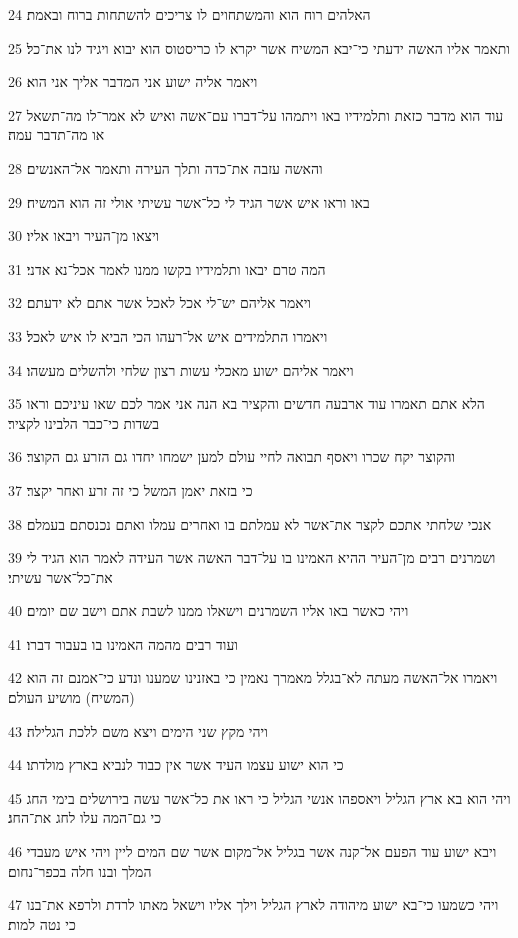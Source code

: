 \par 24 האלהים רוח הוא והמשתחוים לו צריכים להשתחות ברוח ובאמת׃
\par 25 ותאמר אליו האשה ידעתי כי־יבא המשיח אשר יקרא לו כריסטוס הוא יבוא ויגיד לנו את־כל׃
\par 26 ויאמר אליה ישוע אני המדבר אליך אני הוא׃
\par 27 עוד הוא מדבר כזאת ותלמידיו באו ויתמהו על־דברו עם־אשה ואיש לא אמר־לו מה־תשאל או מה־תדבר עמה׃
\par 28 והאשה עזבה את־כדה ותלך העירה ותאמר אל־האנשים׃
\par 29 באו וראו איש אשר הגיד לי כל־אשר עשיתי אולי זה הוא המשיח׃
\par 30 ויצאו מן־העיר ויבאו אליו׃
\par 31 המה טרם יבאו ותלמידיו בקשו ממנו לאמר אכל־נא אדני׃
\par 32 ויאמר אליהם יש־לי אכל לאכל אשר אתם לא ידעתם׃
\par 33 ויאמרו התלמידים איש אל־רעהו הכי הביא לו איש לאכל׃
\par 34 ויאמר אליהם ישוע מאכלי עשות רצון שלחי ולהשלים מעשהו׃
\par 35 הלא אתם תאמרו עוד ארבעה חדשים והקציר בא הנה אני אמר לכם שאו עיניכם וראו בשדות כי־כבר הלבינו לקציר׃
\par 36 והקוצר יקח שכרו ויאסף תבואה לחיי עולם למען ישמחו יחדו גם הזרע גם הקוצר׃
\par 37 כי בזאת יאמן המשל כי זה זרע ואחר יקצר׃
\par 38 אנכי שלחתי אתכם לקצר את־אשר לא עמלתם בו ואחרים עמלו ואתם נכנסתם בעמלם׃
\par 39 ושמרנים רבים מן־העיר ההיא האמינו בו על־דבר האשה אשר העידה לאמר הוא הגיד לי את־כל־אשר עשיתי׃
\par 40 ויהי כאשר באו אליו השמרנים וישאלו ממנו לשבת אתם וישב שם יומים׃
\par 41 ועוד רבים מהמה האמינו בו בעבור דברו׃
\par 42 ויאמרו אל־האשה מעתה לא־בגלל מאמרך נאמין כי באזנינו שמענו ונדע כי־אמנם זה הוא (המשיח) מושיע העולם׃
\par 43 ויהי מקץ שני הימים ויצא משם ללכת הגלילה׃
\par 44 כי הוא ישוע עצמו העיד אשר אין כבוד לנביא בארץ מולדתו׃
\par 45 ויהי הוא בא ארץ הגליל ויאספהו אנשי הגליל כי ראו את כל־אשר עשה בירושלים בימי החג כי גם־המה עלו לחג את־החג׃
\par 46 ויבא ישוע עוד הפעם אל־קנה אשר בגליל אל־מקום אשר שם המים ליין ויהי איש מעבדי המלך ובנו חלה בכפר־נחום׃
\par 47 ויהי כשמעו כי־בא ישוע מיהודה לארץ הגליל וילך אליו וישאל מאתו לרדת ולרפא את־בנו כי נטה למות׃
